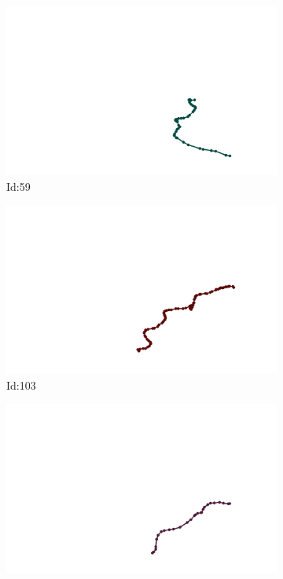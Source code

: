 \documentclass[12pt,twoside]{report}
\begin{document}
\begin{figure}
\centering
\begin{subfigure}[b]{0.20\textwidth}
\centering
\includegraphics[width=\textwidth]{../../trajectories/59.png}
\caption{Id:59}
\end{subfigure}
\begin{subfigure}[b]{0.20\textwidth}
\centering
\includegraphics[width=\textwidth]{../../trajectories/103.png}
\caption{Id:103}
\end{subfigure}
\begin{subfigure}[b]{0.20\textwidth}
\centering
\includegraphics[width=\textwidth]{../../trajectories/211.png}

\end{subfigure}
\end{figure}
\end{document}
